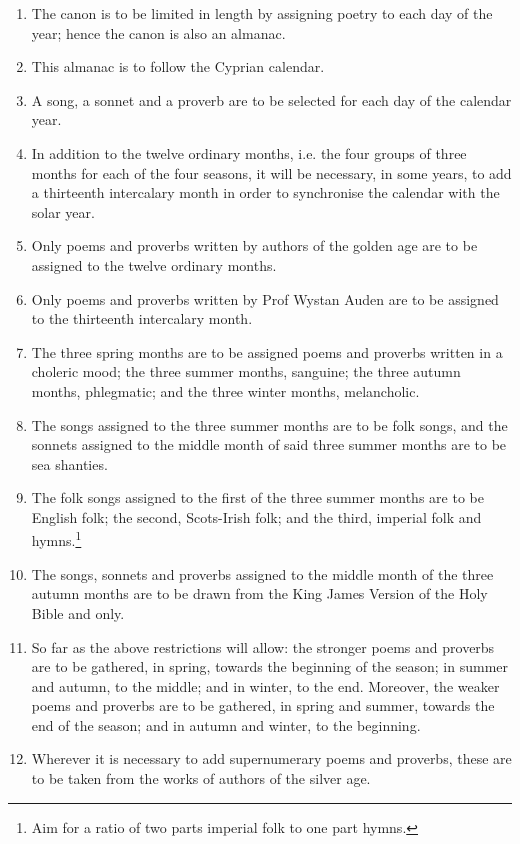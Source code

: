 \begin{enumerate}[resume]
    \item{The canon is to be limited in length by assigning poetry to each day of the year; hence the canon is also an almanac.}
    \item{This almanac is to follow the Cyprian calendar.}
    \item{A song, a sonnet and a proverb are to be selected for each day of the calendar year.}
    \item{In addition to the twelve ordinary months, i.e. the four groups of three months for each of the four seasons, it will be necessary, in some years, to add a thirteenth intercalary month in order to synchronise the calendar with the solar year.}
    \item{Only poems and proverbs written by authors of the golden age are to be assigned to the twelve ordinary months.}
    \item{Only poems and proverbs written by Prof Wystan Auden are to be assigned to the thirteenth intercalary month.}
    \item{The three spring months are to be assigned poems and proverbs written in a choleric mood; the three summer months, sanguine; the three autumn months, phlegmatic; and the three winter months, melancholic.}
    \item{The songs assigned to the three summer months are to be folk songs, and the sonnets assigned to the middle month of said three summer months are to be sea shanties.}
    \item{The folk songs assigned to the first of the three summer months are to be English folk; the second, Scots-Irish folk; and the third, imperial folk and hymns.\footnote{Aim for a ratio of two parts imperial folk to one part hymns.}}
    \item{The songs, sonnets and proverbs assigned to the middle month of the three autumn months are to be drawn from the King James Version of the Holy Bible and  only.}
    \item{So far as the above restrictions will allow: the stronger poems and proverbs are to be gathered, in spring, towards the beginning of the season; in summer and autumn, to the middle; and in winter, to the end. Moreover, the weaker poems and proverbs are to be gathered, in spring and summer, towards the end of the season; and in autumn and winter, to the beginning.}
    \item{Wherever it is necessary to add supernumerary poems and proverbs, these are to be taken from the works of authors of the silver age.}
\end{enumerate}

